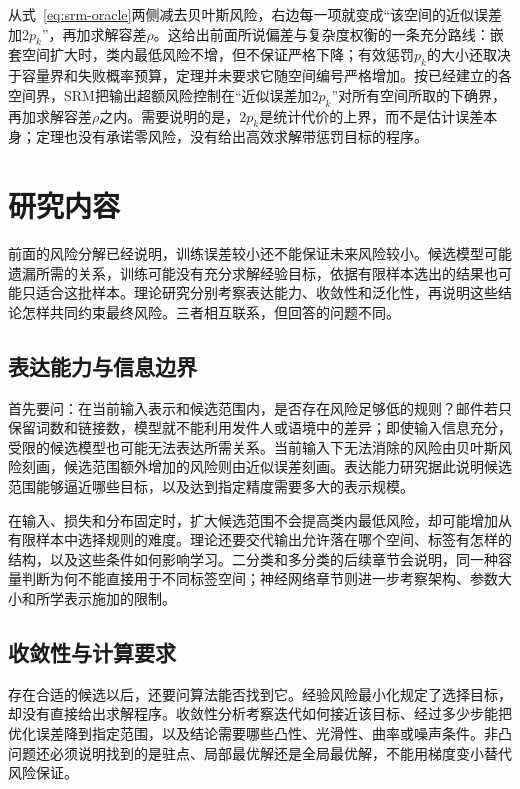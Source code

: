 从式~\eqref{eq:srm-oracle}两侧减去贝叶斯风险，右边每一项就变成“该空间的近似误差加$2p_k$”，再加求解容差$\rho$。这给出前面所说偏差与复杂度权衡的一条充分路线：嵌套空间扩大时，类内最低风险不增，但不保证严格下降；有效惩罚$p_k$的大小还取决于容量界和失败概率预算，定理并未要求它随空间编号严格增加。按已经建立的各空间界，SRM把输出超额风险控制在“近似误差加$2p_k$”对所有空间所取的下确界，再加求解容差$\rho$之内。需要说明的是，$2p_k$是统计代价的上界，而不是估计误差本身；定理也没有承诺零风险，没有给出高效求解带惩罚目标的程序。

\FloatBarrier

\FloatBarrier

\section{研究内容}
\label{sec:learning-theory-research-content}

前面的风险分解已经说明，训练误差较小还不能保证未来风险较小。候选模型可能遗漏所需的关系，训练可能没有充分求解经验目标，依据有限样本选出的结果也可能只适合这批样本。理论研究分别考察表达能力、收敛性和泛化性，再说明这些结论怎样共同约束最终风险。三者相互联系，但回答的问题不同。

\subsection{表达能力与信息边界}

首先要问：在当前输入表示和候选范围内，是否存在风险足够低的规则？邮件若只保留词数和链接数，模型就不能利用发件人或语境中的差异；即使输入信息充分，受限的候选模型也可能无法表达所需关系。当前输入下无法消除的风险由贝叶斯风险刻画，候选范围额外增加的风险则由近似误差刻画。表达能力研究据此说明候选范围能够逼近哪些目标，以及达到指定精度需要多大的表示规模。

在输入、损失和分布固定时，扩大候选范围不会提高类内最低风险，却可能增加从有限样本中选择规则的难度。理论还要交代输出允许落在哪个空间、标签有怎样的结构，以及这些条件如何影响学习。二分类和多分类的后续章节会说明，同一种容量判断为何不能直接用于不同标签空间；神经网络章节则进一步考察架构、参数大小和所学表示施加的限制。

\subsection{收敛性与计算要求}

存在合适的候选以后，还要问算法能否找到它。经验风险最小化规定了选择目标，却没有直接给出求解程序。收敛性分析考察迭代如何接近该目标、经过多少步能把优化误差降到指定范围，以及结论需要哪些凸性、光滑性、曲率或噪声条件。非凸问题还必须说明找到的是驻点、局部最优解还是全局最优解，不能用梯度变小替代风险保证。

